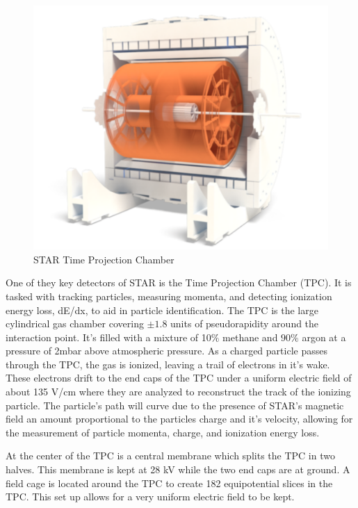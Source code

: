 \documentclass[abstract = on,listof=totoc, bibliography=totoc]{scrreprt}
\begin{document}
\begin{figure}[h!]
\begin{center}
\includegraphics[width = .7\textwidth]{TPCfull}
\caption[STAR Time Projection Chamber]{STAR Time Projection Chamber}
\label{fig:tpcSchem}
\end{center}
\end{figure}


One of they key detectors of STAR is the Time Projection Chamber (TPC). It is tasked with tracking particles, measuring momenta, and detecting ionization energy loss, dE/dx, to aid in particle identification. The TPC is the large cylindrical gas chamber covering $\pm1.8$ units of pseudorapidity around the interaction point. It's filled with a mixture of 10$\%$ methane and $90\%$ argon at a pressure of 2mbar above atmospheric pressure. As a charged particle passes through the TPC, the gas is ionized, leaving a trail of electrons in it's wake. These electrons drift to the end caps of the TPC under a uniform electric field of about 135 V/cm where they are analyzed to reconstruct the track of the ionizing particle. The particle's path will curve due to the presence of STAR's magnetic field an amount proportional to the particles charge and it's velocity, allowing for the measurement of particle momenta, charge, and ionization energy loss.





At the center of the TPC is a central membrane which splits the TPC in two halves. This membrane is kept at 28 kV while the two end caps are at ground. A field cage is located around the TPC to create 182 equipotential slices in the TPC. This set up allows for a very uniform electric field to be kept.   
\end{document}
